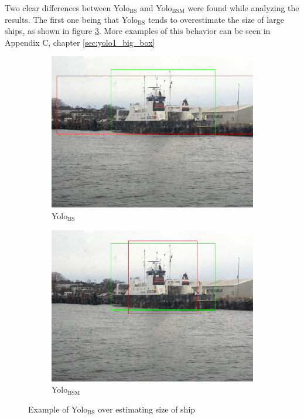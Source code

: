 \vspace{3mm}

Two clear differences between Yolo$_{\text{BS}}$ and Yolo$_{\text{BSM}}$ were found while analyzing the results. The first one being that Yolo$_{\text{BS}}$ tends to overestimate the size of large ships, as shown in figure \ref{fig:yolo12_big}. More examples of this behavior can be seen in Appendix C, chapter \ref{sec:yolo1_big_box}

\begin{figure}[h!]
\begin{subfigure}{.5\textwidth}
  \centering
  \includegraphics[width=0.8\linewidth]{results/case_tr_moor/yolo12/yolo1/big/IMG_2566.jpg}
  \caption{Yolo$_{\text{BS}}$}
  \label{fig:yolo1_big}
\end{subfigure}%
\begin{subfigure}{.5\textwidth}
  \centering
  \includegraphics[width=.8\linewidth]{results/case_tr_moor/yolo12/yolo2/big/IMG_2566.jpg}
  \caption{Yolo$_{\text{BSM}}$}
  \label{fig:yolo2_big}
\end{subfigure}
\caption{Example of Yolo$_{\text{BS}}$ over estimating size of ship}
\label{fig:yolo12_big}
\end{figure}

